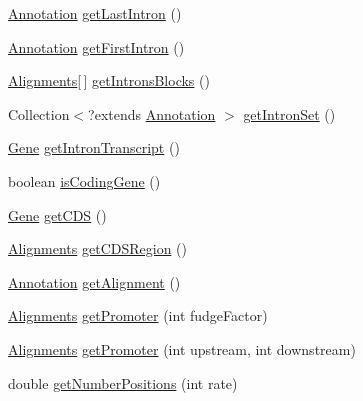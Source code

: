\begin{DoxyCompactItemize}
\item 
\hyperlink{interfaceumms_1_1core_1_1annotation_1_1_annotation}{Annotation} \hyperlink{classumms_1_1core_1_1annotation_1_1_gene_a74728d0843f18d11420ec15bab53a2b1}{get\+Last\+Intron} ()
\item 
\hyperlink{interfaceumms_1_1core_1_1annotation_1_1_annotation}{Annotation} \hyperlink{classumms_1_1core_1_1annotation_1_1_gene_a9803bda081210c957bccfe1a205d0b5f}{get\+First\+Intron} ()
\item 
\hyperlink{classbroad_1_1pda_1_1datastructures_1_1_alignments}{Alignments}\mbox{[}$\,$\mbox{]} \hyperlink{classumms_1_1core_1_1annotation_1_1_gene_aa6c38c831dfee6a932f6c6ebdab96384}{get\+Introns\+Blocks} ()
\item 
Collection$<$?extends \hyperlink{interfaceumms_1_1core_1_1annotation_1_1_annotation}{Annotation} $>$ \hyperlink{classumms_1_1core_1_1annotation_1_1_gene_aa0f15894f4ab4ed9112de6cab211876d}{get\+Intron\+Set} ()
\item 
\hyperlink{classumms_1_1core_1_1annotation_1_1_gene}{Gene} \hyperlink{classumms_1_1core_1_1annotation_1_1_gene_a921d5aac3c0e8e5b5ff2de7328e5d68e}{get\+Intron\+Transcript} ()
\item 
boolean \hyperlink{classumms_1_1core_1_1annotation_1_1_gene_ad2a651cd125ea1ebea3f496cb62853e3}{is\+Coding\+Gene} ()
\item 
\hyperlink{classumms_1_1core_1_1annotation_1_1_gene}{Gene} \hyperlink{classumms_1_1core_1_1annotation_1_1_gene_ae414757cb1720273e4f4a3188978eb49}{get\+C\+D\+S} ()
\item 
\hyperlink{classbroad_1_1pda_1_1datastructures_1_1_alignments}{Alignments} \hyperlink{classumms_1_1core_1_1annotation_1_1_gene_a2bbe2bac12a9b9f09bfb2962e8a72d67}{get\+C\+D\+S\+Region} ()
\item 
\hyperlink{interfaceumms_1_1core_1_1annotation_1_1_annotation}{Annotation} \hyperlink{classumms_1_1core_1_1annotation_1_1_gene_ab24320099ec493ae869b31bececfa418}{get\+Alignment} ()
\item 
\hyperlink{classbroad_1_1pda_1_1datastructures_1_1_alignments}{Alignments} \hyperlink{classumms_1_1core_1_1annotation_1_1_gene_ac451f8e1e543c0efb00cdb06f192ce9e}{get\+Promoter} (int fudge\+Factor)
\item 
\hyperlink{classbroad_1_1pda_1_1datastructures_1_1_alignments}{Alignments} \hyperlink{classumms_1_1core_1_1annotation_1_1_gene_a7547d62e9d7421183cf1aafc864a2e1a}{get\+Promoter} (int upstream, int downstream)
\item 
double \hyperlink{classumms_1_1core_1_1annotation_1_1_gene_a34660b307472e14d299bae95902346ef}{get\+Number\+Positions} (int rate)

\end{DoxyCompactItemize}
